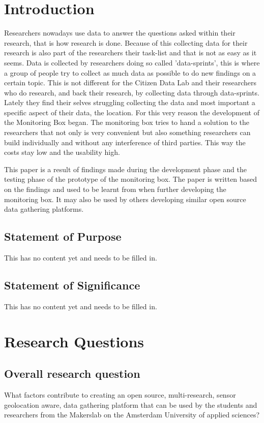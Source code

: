 \documentclass[conference]{IEEEtran}
\begin{document}
\IEEEpeerreviewmaketitle

\section{Introduction}
 Researchers nowadays use data to answer the questions asked within their research, that is how research is done. Because of this collecting data for their research is also part of the researchers their task-list and that is not as easy as it seems. Data is collected by researchers doing so called 'data-sprints', this is where a group of people try to collect as much data as possible to do new findings on a certain topic. This is not different for the Citizen Data Lab and their researchers who do research, and back their research, by collecting data through data-sprints. Lately they find their selves struggling collecting the data and most important a specific aspect of their data, the location. For this very reason the development of the Monitoring Box began. The monitoring box tries to hand a solution to the researchers that not only is very convenient but also something researchers can build individually and without any interference of third parties. This way the costs stay low and the usability high. \par
This paper is a result of findings made during the development phase and the testing phase of the prototype of the monitoring box. The paper is written based on the findings and used to be learnt from when further developing the monitoring box. It may also be used by others developing similar open source data gathering platforms.

\subsection{Statement of Purpose}
This has no content yet and needs to be filled in. 

\subsection{Statement of Significance}
This has no content yet and needs to be filled in. 

\section{Research Questions}

\subsection{Overall research question}
What factors contribute to creating an open source, multi-research, sensor geolocation aware, data gathering platform that can be used by the students and researchers from the Makerslab on the Amsterdam University of applied sciences?
\end{document}
